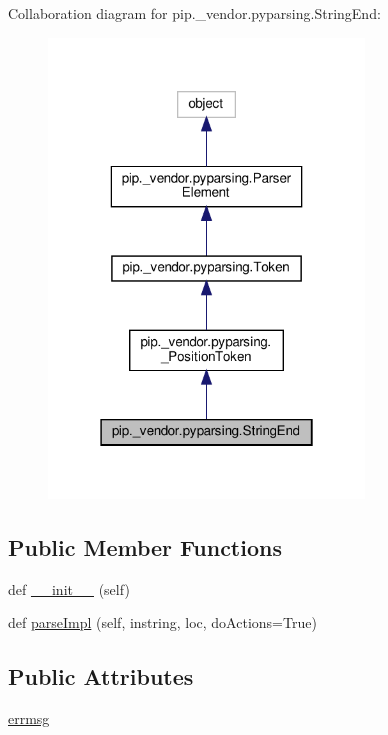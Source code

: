 Collaboration diagram for pip.\+\_\+vendor.\+pyparsing.\+String\+End\+:
\nopagebreak
\begin{figure}[H]
\begin{center}
\leavevmode
\includegraphics[width=238pt]{classpip_1_1__vendor_1_1pyparsing_1_1StringEnd__coll__graph}
\end{center}
\end{figure}
\subsection*{Public Member Functions}
\begin{DoxyCompactItemize}
\item 
def \hyperlink{classpip_1_1__vendor_1_1pyparsing_1_1StringEnd_a960f33c6e4a5f8f643ef02a11a52f66d}{\+\_\+\+\_\+init\+\_\+\+\_\+} (self)
\item 
def \hyperlink{classpip_1_1__vendor_1_1pyparsing_1_1StringEnd_a0eb3eeb94196e2fdea666e9037b998e6}{parse\+Impl} (self, instring, loc, do\+Actions=True)
\end{DoxyCompactItemize}
\subsection*{Public Attributes}
\begin{DoxyCompactItemize}
\item 
\hyperlink{classpip_1_1__vendor_1_1pyparsing_1_1StringEnd_a43adf228e9caca5ba34ef7c8a417605d}{errmsg}
\end{DoxyCompactItemize}

